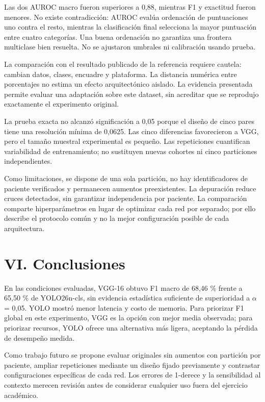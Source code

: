 \documentclass[conference]{IEEEtran}
\begin{document}
Las dos AUROC macro fueron superiores a 0,88, mientras F1 y exactitud fueron menores. No existe contradicción: AUROC evalúa ordenación de puntuaciones uno contra el resto, mientras la clasificación final selecciona la mayor puntuación entre cuatro categorías. Una buena ordenación no garantiza una frontera multiclase bien resuelta. No se ajustaron umbrales ni calibración usando prueba.

La comparación con el resultado publicado de la referencia requiere cautela: cambian datos, clases, encuadre y plataforma. La distancia numérica entre porcentajes no estima un efecto arquitectónico aislado. La evidencia presentada permite evaluar una adaptación sobre este dataset, sin acreditar que se reprodujo exactamente el experimento original.

La prueba exacta no alcanzó significación a 0,05 porque el diseño de cinco pares tiene una resolución mínima de 0,0625. Las cinco diferencias favorecieron a VGG, pero el tamaño muestral experimental es pequeño. Las repeticiones cuantifican variabilidad de entrenamiento; no sustituyen nuevas cohortes ni cinco particiones independientes.

Como limitaciones, se dispone de una sola partición, no hay identificadores de paciente verificados y permanecen aumentos preexistentes. La depuración reduce cruces detectados, sin garantizar independencia por paciente. La comparación comparte hiperparámetros en lugar de optimizar cada red por separado; por ello describe el protocolo común y no la mejor configuración posible de cada arquitectura.

\section*{VI. Conclusiones}
En las condiciones evaluadas, VGG-16 obtuvo F1 macro de 68,46 \% frente a 65,50 \% de YOLO26n-cls, sin evidencia estadística suficiente de superioridad a $\alpha$ = 0,05. YOLO mostró menor latencia y costo de memoria. Para priorizar F1 global en este experimento, VGG es la opción con mejor media observada; para priorizar recursos, YOLO ofrece una alternativa más ligera, aceptando la pérdida de desempeño medida.

Como trabajo futuro se propone evaluar originales sin aumentos con partición por paciente, ampliar repeticiones mediante un diseño fijado previamente y contrastar configuraciones específicas de cada red. Los errores de 1-derece y la sensibilidad al contexto merecen revisión antes de considerar cualquier uso fuera del ejercicio académico.
\end{document}
